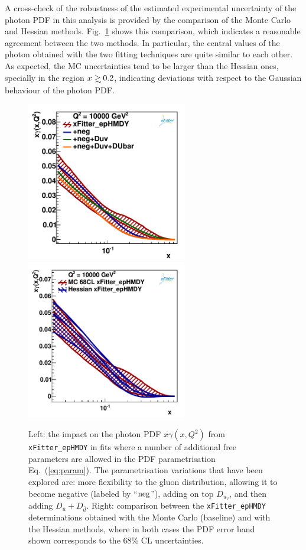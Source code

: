 A cross-check of the robustness of the estimated
experimental uncertainty of the photon PDF in this analysis is provided by the
comparison of the Monte Carlo and Hessian methods.
%
Fig.~\ref{fig:photon_mc_vs_hessian} shows this comparison, which
indicates a reasonable agreement between the two methods.
%
In particular, the central values of the photon obtained with the two
fitting techniques are quite similar to each other.
%
As expected, the MC uncertainties tend to be larger than the Hessian ones,
specially in the region $x\gsim 0.2$, indicating deviations with respect
to the Gaussian behaviour of the photon PDF.

\begin{figure}[t]
\centering
\includegraphics[width=7cm]{figs/q2_10000_pdf_ph_param_var.pdf}
\includegraphics[width=7cm]{figs/photon_mc_vs_hessian} 
\caption{Left: the impact on the photon PDF $x\gamma(x,Q^2)$
  from {\tt xFitter\_epHMDY}
  in fits where a number of additional free parameters are allowed
  in the PDF parametrisation Eq.~(\ref{eq:param}).
  The parametrisation variations that have been explored
  are: more flexibility to the gluon distribution, allowing
  it to become negative
  (labeled by ``${\rm neg}$''), adding on top $D_{u_v}$, and then
  adding $D_{\bar{u}}+D_{\bar{d}}$.
 Right: comparison between the {\tt xFitter\_epHMDY} determinations obtained with the
 Monte Carlo (baseline) and with the Hessian methods, where in
  both cases the PDF error band  shown corresponds to the 68\% CL uncertainties.  }
\label{fig:param}
\label{fig:photon_mc_vs_hessian}
\end{figure}

